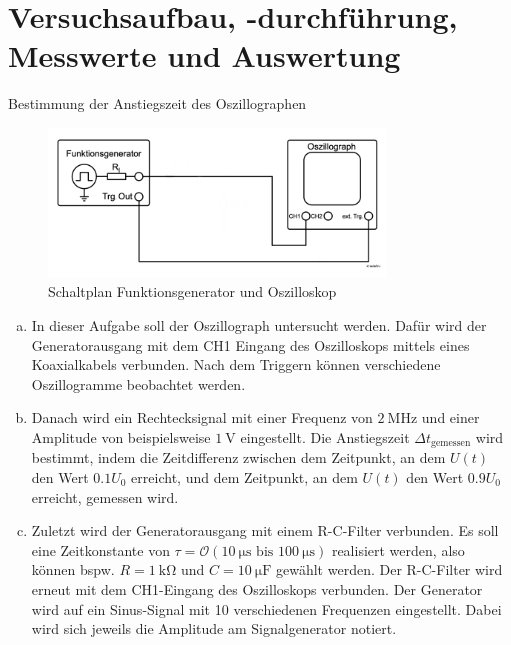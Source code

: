 \documentclass[ngerman]{scrartcl}
\theoremstyle{definition}
\begin{document}
	\section{Versuchsaufbau, -durchführung, Messwerte und Auswertung}
		\begin{aufgabe}{Bestimmung der Anstiegszeit des Oszillographen}
			\aufbau
			\begin{figure}[H]
				\centering
				\includegraphics[width=0.8\textwidth]{figs/Aufbau_0_1_Oszilloskop.png}
				\caption{Schaltplan Funktionsgenerator und Oszilloskop~\cite{anleitung}}
				\label{fig:aufbau_0_1_oszilloskop.png}
			\end{figure}
			\begin{enumerate}[(a)]
				\item In dieser Aufgabe soll der Oszillograph untersucht werden. Dafür wird der Generatorausgang mit dem CH1 Eingang des Oszilloskops mittels eines Koaxialkabels verbunden. Nach dem Triggern können verschiedene Oszillogramme beobachtet werden.
				\item Danach wird ein Rechtecksignal mit einer Frequenz von $\SI{2}{\mega\hertz}$ und einer Amplitude von beispielsweise $\SI{1}{\volt}$ eingestellt. Die Anstiegszeit $\Delta t_\mathrm{gemessen}$ wird bestimmt, indem die Zeitdifferenz zwischen dem Zeitpunkt, an dem $U(t)$ den Wert $0.1 U_0$ erreicht, und dem Zeitpunkt, an dem $U(t)$ den Wert $0.9 U_0$ erreicht, gemessen wird.
				\item Zuletzt wird der Generatorausgang mit einem R-C-Filter verbunden. Es soll eine Zeitkonstante von $\tau = \mathcal{O}(\SI{10}{\micro\second} \text{ bis } \SI{100}{\micro\second})$ realisiert werden, also können bspw. $R = \SI{1}{\kilo\ohm}$ und $C = \SI{10}{\micro\farad}$ gewählt werden. Der R-C-Filter wird erneut mit dem CH1-Eingang des Oszilloskops verbunden. Der Generator wird auf ein Sinus-Signal mit 10 verschiedenen Frequenzen eingestellt. Dabei wird sich jeweils die Amplitude am Signalgenerator notiert.
			\end{enumerate}
			\MesswUndAusw
			\begin{unteraufgabe}

\end{unteraufgabe}
\end{aufgabe}
\end{document}
